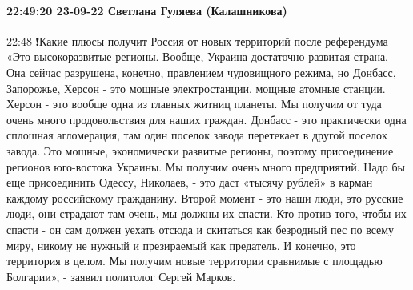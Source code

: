 \paragraph{22:49:20 23-09-22 Светлана Гуляева (Калашникова)}
22:48
❗️Какие плюсы получит Россия от новых территорий после референдума
«Это высокоразвитые регионы. Вообще, Украина достаточно развитая страна. Она сейчас разрушена, конечно, правлением чудовищного режима, но Донбасс, Запорожье, Херсон - это мощные электростанции, мощные атомные станции. Херсон - это вообще одна из главных житниц планеты. Мы получим от туда очень много продовольствия для наших граждан.
Донбасс - это практически одна сплошная агломерация, там один поселок завода перетекает в другой поселок завода. Это мощные, экономически развитые регионы, поэтому присоединение регионов юго-востока Украины. Мы получим очень много предприятий. Надо бы еще присоединить Одессу, Николаев, - это даст «тысячу рублей» в карман каждому российскому гражданину.
Второй момент - это наши люди, это русские люди, они страдают там очень, мы должны их спасти. Кто против того, чтобы их спасти - он сам должен уехать отсюда и скитаться как безродный пес по всему миру, никому не нужный и презираемый как предатель.
И конечно, это территория в целом. Мы получим новые территории сравнимые с площадью Болгарии», - заявил политолог Сергей Марков.


